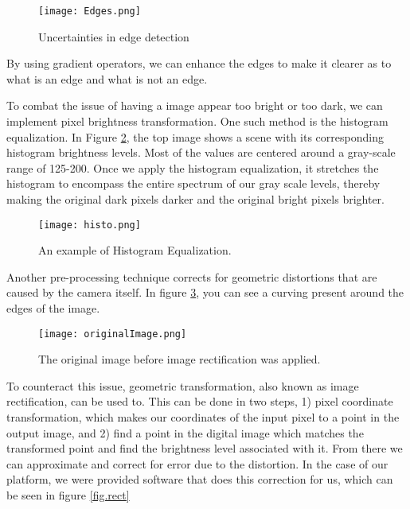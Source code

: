 \documentclass[12pt]{article}
\begin{document}
\begin{figure}[htp!]
	\begin{center}
		\texttt{[image: Edges.png]}
		\caption{Uncertainties in edge detection}  \label{fig.edge}
	\end{center}
\end{figure}

By using gradient operators, we can enhance the edges to make it clearer as to what is an edge and what is not an edge.

To combat the issue of having a image appear too bright or too dark, we can implement pixel brightness transformation. One such method is the histogram equalization. In Figure \ref{fig.histo}, the top image shows a scene with its corresponding histogram brightness levels. Most of the values are centered around a gray-scale range of 125-200. Once we apply the histogram equalization, it stretches the histogram to encompass the entire spectrum of our gray scale levels, thereby making the original dark pixels darker and the original bright pixels brighter.

\begin{figure}[htp!]
	\begin{center}
		\texttt{[image: histo.png]}
		\caption{An example of Histogram Equalization.}  \label{fig.histo}
	\end{center}
\end{figure}

Another pre-processing technique corrects for geometric distortions that are caused by the camera itself. In figure \ref{fig.original}, you can see a curving present around the edges of the image. 

\begin{figure}[htp!]
	\begin{center}
		\texttt{[image: originalImage.png]}
		\caption{The original image before image rectification was applied.}  \label{fig.original}
	\end{center}
\end{figure}

To counteract this issue, geometric transformation, also known as image rectification, can be used to. This can be done in two steps, 1) pixel coordinate transformation, which makes our coordinates of the input pixel to a point in the output image, and 2) find a point in the digital image which matches the transformed point and find the brightness level associated with it. From there we can approximate and correct for error due to the distortion. In the case of our platform, we were provided software that does this correction for us, which can be seen in figure \ref{fig.rect}
\end{document}
